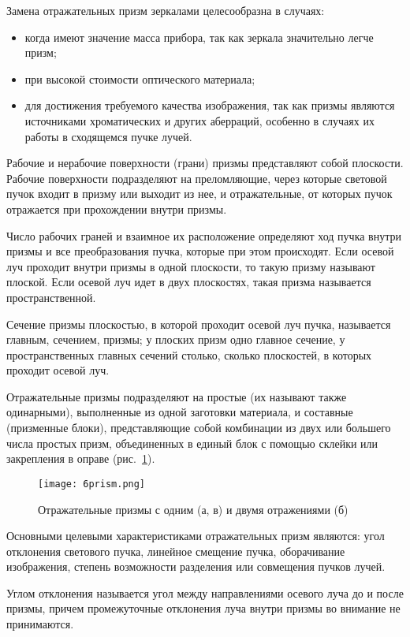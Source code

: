 Замена отражательных призм зеркалами целесообразна в случаях:
\begin{itemize}
\item когда имеют значение масса прибора, так как зеркала значительно легче призм; 
\item при высокой стоимости оптического материала;
\item для достижения требуемого качества изображения, так как призмы являются источниками хроматических и других аберраций, особенно в случаях их работы в сходящемся пучке лучей.
\end{itemize}

Рабочие и нерабочие поверхности (грани) призмы представляют собой плоскости. Рабочие поверхности подразделяют на преломляющие, через которые световой пучок входит в призму или выходит из нее, и отражательные, от которых пучок отражается при прохождении внутри призмы.

Число рабочих граней и взаимное их расположение определяют ход пучка внутри призмы и все преобразования пучка, которые при этом происходят.
Если осевой луч проходит внутри призмы в одной плоскости, то такую призму называют плоской. Если осевой луч идет в двух плоскостях, такая призма называется пространственной.

Сечение призмы плоскостью, в которой проходит осевой луч пучка, называется главным, сечением, призмы; у плоских призм одно главное сечение, у пространственных главных сечений столько, сколько плоскостей, в которых проходит осевой луч.

Отражательные призмы подразделяют на простые (их называют также одинарными), выполненные из одной заготовки материала, и составные (призменные блоки), представляющие собой комбинации из двух или большего числа простых призм, объединенных в единый блок с помощью склейки или закрепления в оправе (рис.~\ref{pic:6prism}).

\begin{figure}[h!]
	\caption{ Отражательные призмы с одним (а, в) и двумя отражениями (б) }
	\texttt{[image: 6prism.png]}
	\label{pic:6prism}
\end{figure}

Основными целевыми характеристиками отражательных призм являются: угол отклонения светового пучка, линейное смещение пучка, оборачивание изображения, степень возможности разделения или совмещения пучков лучей.

Углом отклонения называется угол между направлениями осевого луча до и после призмы, причем промежуточные отклонения луча внутри призмы во внимание не принимаются.

